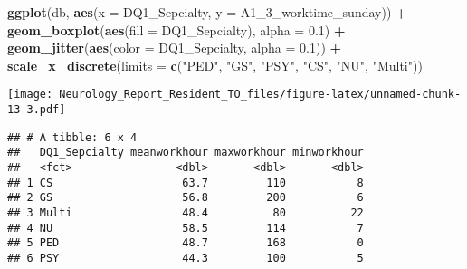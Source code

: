 \documentclass[]{book}
\newenvironment{Shaded}{\begin{snugshade}}{\end{snugshade}}
\newcommand{\DataTypeTok}[1]{\textcolor[rgb]{0.13,0.29,0.53}{#1}}
\newcommand{\DecValTok}[1]{\textcolor[rgb]{0.00,0.00,0.81}{#1}}
\newcommand{\FloatTok}[1]{\textcolor[rgb]{0.00,0.00,0.81}{#1}}
\newcommand{\KeywordTok}[1]{\textcolor[rgb]{0.13,0.29,0.53}{\textbf{#1}}}
\newcommand{\NormalTok}[1]{#1}
\newcommand{\OperatorTok}[1]{\textcolor[rgb]{0.81,0.36,0.00}{\textbf{#1}}}
\newcommand{\StringTok}[1]{\textcolor[rgb]{0.31,0.60,0.02}{#1}}
\begin{document}
\begin{Shaded}
\begin{Highlighting}[]
\KeywordTok{ggplot}\NormalTok{(db, }\KeywordTok{aes}\NormalTok{(}\DataTypeTok{x =}\NormalTok{ DQ1_Sepcialty, }\DataTypeTok{y =}\NormalTok{ A1_}\DecValTok{3}\NormalTok{_worktime_sunday)) }\OperatorTok{+}
\StringTok{  }\KeywordTok{geom_boxplot}\NormalTok{(}\KeywordTok{aes}\NormalTok{(}\DataTypeTok{fill =}\NormalTok{ DQ1_Sepcialty), }\DataTypeTok{alpha =} \FloatTok{0.1}\NormalTok{) }\OperatorTok{+}\StringTok{ }
\StringTok{  }\KeywordTok{geom_jitter}\NormalTok{(}\KeywordTok{aes}\NormalTok{(}\DataTypeTok{color =}\NormalTok{ DQ1_Sepcialty, }\DataTypeTok{alpha =} \FloatTok{0.1}\NormalTok{)) }\OperatorTok{+}
\StringTok{  }\KeywordTok{scale_x_discrete}\NormalTok{(}\DataTypeTok{limits =} \KeywordTok{c}\NormalTok{(}\StringTok{"PED"}\NormalTok{, }\StringTok{"GS"}\NormalTok{, }\StringTok{"PSY"}\NormalTok{, }\StringTok{"CS"}\NormalTok{, }\StringTok{"NU"}\NormalTok{, }\StringTok{"Multi"}\NormalTok{))}
\end{Highlighting}
\end{Shaded}

\texttt{[image: Neurology\_Report\_Resident\_TO\_files/figure-latex/unnamed-chunk-13-3.pdf]}

\begin{Shaded}
\end{Shaded}

\begin{verbatim}
## # A tibble: 6 x 4
##   DQ1_Sepcialty meanworkhour maxworkhour minworkhour
##   <fct>                <dbl>       <dbl>       <dbl>
## 1 CS                    63.7         110           8
## 2 GS                    56.8         200           6
## 3 Multi                 48.4          80          22
## 4 NU                    58.5         114           7
## 5 PED                   48.7         168           0
## 6 PSY                   44.3         100           5
\end{verbatim}
\end{document}
